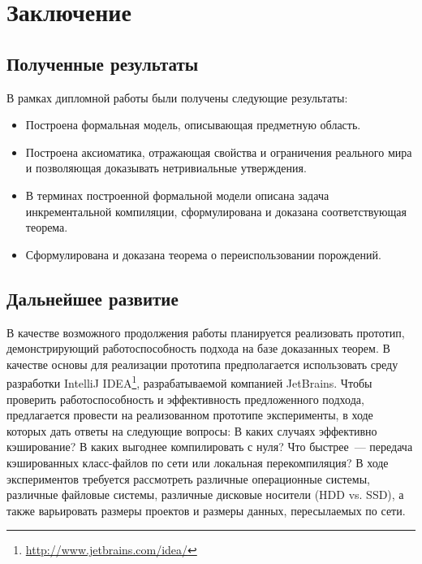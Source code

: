 \section{Заключение}

\subsection{Полученные результаты}

В рамках дипломной работы были получены следующие результаты:

\begin{itemize}

	\item Построена формальная модель, описывающая предметную область.

	\item Построена аксиоматика, отражающая свойства и ограничения реального мира и позволяющая доказывать нетривиальные утверждения.

	\item В терминах построенной формальной модели описана задача инкрементальной компиляции, сформулирована и доказана соответствующая теорема.

	\item Сформулирована и доказана теорема о переиспользовании порождений.

\end{itemize}

\subsection{Дальнейшее развитие}

В качестве возможного продолжения работы планируется реализовать прототип, демонстрирующий работоспособность подхода на базе доказанных теорем. В качестве основы для реализации прототипа предполагается использовать среду разработки IntelliJ IDEA\footnote{\url{http://www.jetbrains.com/idea/}}, разрабатываемой компанией JetBrains. Чтобы проверить работоспособность и эффективность предложенного подхода, предлагается провести на реализованном прототипе эксперименты, в ходе которых дать ответы на следующие вопросы: В каких случаях эффективно кэширование? В каких выгоднее компилировать с нуля? Что быстрее~--- передача кэшированных класс-файлов по сети или локальная перекомпиляция? В ходе экспериментов требуется рассмотреть различные операционные системы, различные файловые системы, различные дисковые носители (HDD vs. SSD), а также варьировать размеры проектов и размеры данных, пересылаемых по сети.

